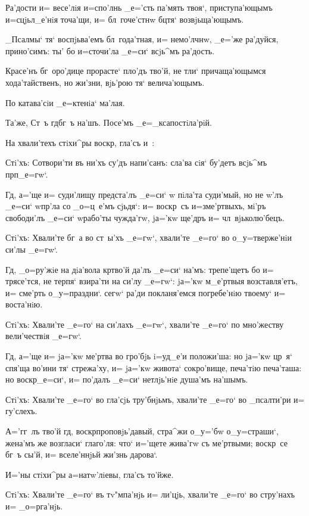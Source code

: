 
Ра'дости и= весе'лiя и=спо'лнь _е='сть па'мять твоя`, 
приступа'ющымъ и=сцjьл_е'нiя точа'щи, и= бл~гоче'стнw 
бц тя` возвjьща'ющымъ.

_Псалмы` тя` воспjьва'емъ бл~года'тная, и= немо'лчнw, 
_е='же ра'дуйся, прино'симъ: ты' бо и=сточи'ла _е=си` 
всjь^мъ ра'дость.

Красе'нъ бг~оро'дице прорасте` пло'дъ тво'й, не тли` 
причаща'ющымся хода'тайственъ, но жи'зни, вjь'рою тя` 
велича'ющымъ.

По катава'сiи _е=ктенiа` ма'лая.

Та'же, Ст~ъ гд бг~ъ на'шъ. Посе'мъ 
_е=_ксапостiла'рiй.

На хвали'техъ стiхи^ры воскр, гла'съ и~:

Стi'хъ: Сотвори'ти въ ни'хъ су'дъ напи'санъ: сла'ва 
сiя` бу'детъ всjь^мъ прп _е=гw`.

Гд, а='ще и= суди'лищу предста'лъ _е=си` w\т 
пiла'та суди'мый, но не w'лъ _е=си` w\т пр'ла 
со _о=ц~е'мъ сjьдя`: и= воскр~съ и=з\ъ ме'ртвыхъ, мi'ръ 
свободи'лъ _е=си` w\т рабо'ты чужда'гw, jа='кw ще'дръ и= 
чл~вjьколю'бецъ.

Стi'хъ: Хвали'те бг~а во ст~ы'хъ _е=гw`, хвали'те 
_е=го` во о_у=тверже'нiи си'лы _е=гw`.

Гд, _о=ру'жiе на дiа'вола кр тво'й да'лъ _е=си` 
на'мъ: трепе'щетъ бо и= трясе'тся, не терпя` взира'ти на 
си'лу _е=гw`: jа='кw м_е'ртвыя возставля'етъ, и= сме'рть 
о_у=праздни`. сегw` ра'ди покланя'емся погребе'нiю 
твоему` и= воста'нiю.

Стi'хъ: Хвали'те _е=го` на си'лахъ _е=гw`, хвали'те 
_е=го` по мно'жеству вели'чествiя _е=гw`.

Гд, а='ще и= jа='кw ме'ртва во гро'бjь i=уд_е'и 
положи'ша: но jа='кw цр~я` спя'ща во'ини тя` стрежа'ху, 
и= jа='кw живота` сокро'вище, печа'тiю печа'таша: но 
воскр _е=си`, и= по'далъ _е=си` нетлjь'нiе душа'мъ 
на'шымъ.

Стi'хъ: Хвали'те _е=го` во гла'сjь тру'бнjьмъ, 
хвали'те _е=го` во _псалти'ри и= гу'слехъ.

А='гг~лъ тво'й гд, воскр проповjь'давый, 
стра^жи о_у='бw о_у=страши`, жена'мъ же возгласи` 
глаго'ля: что` и='щете жива'гw съ ме'ртвыми; воскр~се 
бг~ъ сы'й, и= вселе'ннjьй жи'знь дарова`.

И='ны стiхи^ры а=натw'лiевы, гла'съ то'йже.

Стi'хъ: Хвали'те _е=го` въ тv"мпа'нjь и= ли'цjь, 
хвали'те _е=го` во стру'нахъ и= _о=рга'нjь.

